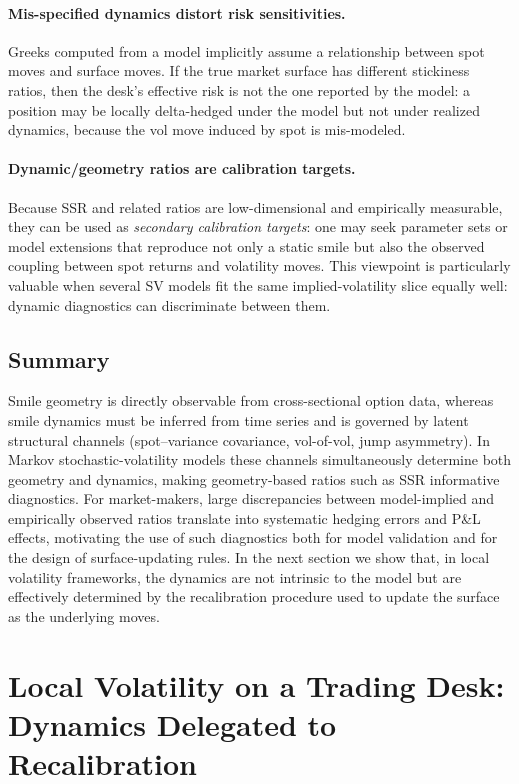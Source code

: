 \documentclass[11pt,a4paper]{report}
\begin{document}
\paragraph{Mis-specified dynamics distort risk sensitivities.}
Greeks computed from a model implicitly assume a relationship between spot moves and surface moves.
If the true market surface has different stickiness ratios, then the desk's effective risk is not the one reported by the model:
a position may be locally delta-hedged under the model but not under realized dynamics, because the vol move induced by spot is mis-modeled.

\paragraph{Dynamic/geometry ratios are calibration targets.}
Because SSR and related ratios are low-dimensional and empirically measurable, they can be used as \emph{secondary calibration targets}:
one may seek parameter sets or model extensions that reproduce not only a static smile but also the observed coupling between spot returns and volatility moves.
This viewpoint is particularly valuable when several SV models fit the same implied-volatility slice equally well: dynamic diagnostics can discriminate between them.

\subsection{Summary}
Smile geometry is directly observable from cross-sectional option data, whereas smile dynamics must be inferred from time series and is governed by latent structural channels (spot--variance covariance, vol-of-vol, jump asymmetry).
In Markov stochastic-volatility models these channels simultaneously determine both geometry and dynamics, making geometry-based ratios such as SSR informative diagnostics.
For market-makers, large discrepancies between model-implied and empirically observed ratios translate into systematic hedging errors and P\&L effects, motivating the use of such diagnostics both for model validation and for the design of surface-updating rules.
In the next section we show that, in local volatility frameworks, the dynamics are not intrinsic to the model but are effectively determined by the recalibration procedure used to update the surface as the underlying moves.

\section{Local Volatility on a Trading Desk: Dynamics Delegated to Recalibration}
\label{sec:localvol_recalibration_dynamics}
\end{document}
